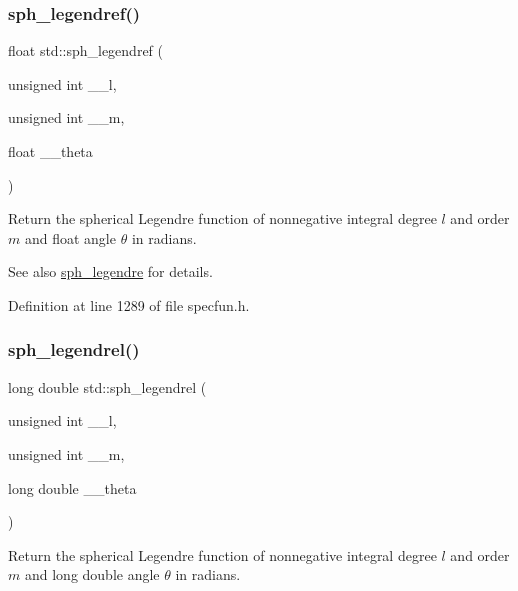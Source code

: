 \subsubsection{\texorpdfstring{sph\+\_\+legendref()}{sph\_legendref()}}
{\footnotesize\ttfamily float std\+::sph\+\_\+legendref (\begin{DoxyParamCaption}\item[{unsigned int}]{\+\_\+\+\_\+l,  }\item[{unsigned int}]{\+\_\+\+\_\+m,  }\item[{float}]{\+\_\+\+\_\+theta }\end{DoxyParamCaption})\hspace{0.3cm}{\ttfamily [inline]}}

Return the spherical Legendre function of nonnegative integral degree $ l $ and order $ m $ and float angle $ \theta $ in radians.

\begin{DoxySeeAlso}{See also}
\hyperlink{group__tr29124__math__spec__func_gacef0d41a7ce572a9ace3437498794ed0}{sph\+\_\+legendre} for details. 
\end{DoxySeeAlso}


Definition at line 1289 of file specfun.\+h.

\mbox{\label{group__tr29124__math__spec__func_ga2f6618dea1847f09fd67f3c974c1910d}} 
\subsubsection{\texorpdfstring{sph\+\_\+legendrel()}{sph\_legendrel()}}
{\footnotesize\ttfamily long double std\+::sph\+\_\+legendrel (\begin{DoxyParamCaption}\item[{unsigned int}]{\+\_\+\+\_\+l,  }\item[{unsigned int}]{\+\_\+\+\_\+m,  }\item[{long double}]{\+\_\+\+\_\+theta }\end{DoxyParamCaption})\hspace{0.3cm}{\ttfamily [inline]}}

Return the spherical Legendre function of nonnegative integral degree $ l $ and order $ m $ and {\ttfamily long double} angle $ \theta $ in radians.


